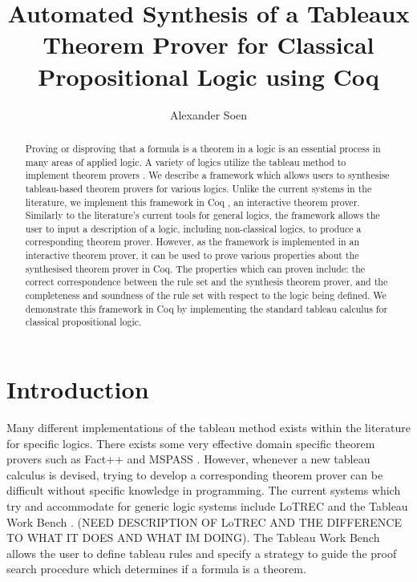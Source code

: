 \documentclass{llncs}
\begin{document}
\title{Automated Synthesis of a Tableaux Theorem Prover for Classical
Propositional Logic using Coq}

\author{Alexander Soen}

\maketitle
%
\begin{abstract}
Proving or disproving that a formula is a theorem in a logic is an essential
process in many areas of applied logic. A variety of logics utilize the tableau
method to implement theorem provers \cite{d2013handbook}. We describe a
framework which allows users to synthesise tableau-based theorem provers for
various logics. Unlike the current systems in the literature, we implement this
framework in Coq \cite{barras1997coq}, an interactive theorem prover. Similarly
to the literature's current tools for general logics, the framework allows the
user to input a description of a logic, including non-classical logics, to
produce a corresponding theorem prover. However, as the framework is
implemented in an interactive theorem prover, it can be used to prove various
properties about the synthesised theorem prover in Coq. The properties which
can proven include: the correct correspondence between the rule set and the
synthesis theorem prover, and the completeness and soundness of the rule set
with respect to the logic being defined. We demonstrate this framework in Coq
by implementing the standard tableau calculus for classical propositional
logic.
\end{abstract}
%
\section{Introduction}
%
Many different implementations of the tableau method exists within the
literature for specific logics. There exists some very effective domain
specific theorem provers such as Fact++ \cite{tsarkov2006fact++}
and MSPASS \cite{hustadt2000mspass}. However, whenever a new tableau calculus is
devised, trying to develop a corresponding theorem prover can be difficult
without specific knowledge in programming. The current systems which try and
accommodate for generic logic systems include LoTREC
\cite{del2001lotrec} and the Tableau Work Bench
\cite{abate2007tableau}. (NEED DESCRIPTION OF LoTREC AND THE
DIFFERENCE TO WHAT IT DOES AND WHAT IM DOING).  The Tableau Work Bench allows
the user to define tableau rules and specify a strategy to guide the proof
search procedure which determines if a formula is a
theorem.
\end{document}
